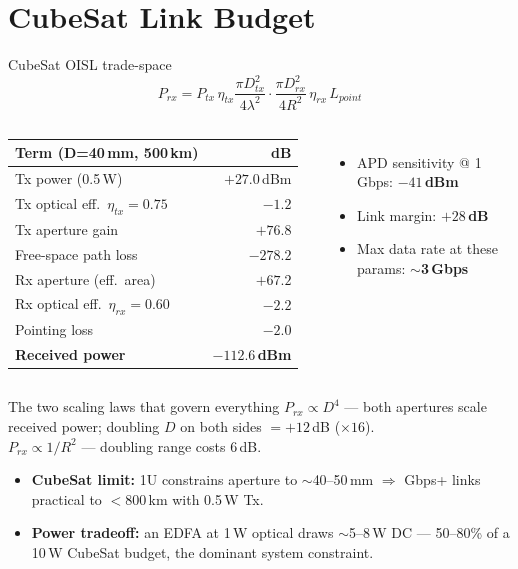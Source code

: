 \documentclass{KAIST-slide}
\newcommand{\ai}{\item[\textcolor{islcteal}{\ding{228}}]}      %
\newcommand{\hi}[1]{\textcolor{islcorange}{\textbf{#1}}}       %
\newcommand{\key}[1]{\textcolor{islcblue}{\textbf{#1}}}        %
\begin{document}
\section{CubeSat Link Budget}

\begin{frame}[allowframebreaks=1.2]{CubeSat OISL trade-space}
    \begin{equation*}
        P_{rx}=P_{tx}\,\eta_{tx}\frac{\pi D_{tx}^{2}}{4\lambda^{2}}\cdot\frac{\pi D_{rx}^{2}}{4R^{2}}\,\eta_{rx}\,L_{point}
    \end{equation*}
    \begin{columns}[T]
    \scriptsize
    \begin{tabular}{l r}
        \hline
        \textbf{Term (D=40\,mm, 500\,km)} & \textbf{dB}\\
        \hline
        Tx power (0.5\,W)        & $+27.0$\,dBm\\
        Tx optical eff.\ $\eta_{tx}=0.75$ & $-1.2$\\
        Tx aperture gain         & $+76.8$\\
        Free-space path loss     & $-278.2$\\
        Rx aperture (eff.\ area)  & $+67.2$\\
        Rx optical eff.\ $\eta_{rx}=0.60$ & $-2.2$\\
        Pointing loss            & $-2.0$\\
        \hline
        \textbf{Received power}  & $\mathbf{-112.6}$\,\textbf{dBm}\\
        \hline
    \end{tabular}
        \begin{itemize}\footnotesize
            \ai APD sensitivity @ 1\,Gbps: \hi{$-41$\,dBm}
            \ai Link margin: \hi{$+28$\,dB}
            \ai Max data rate at these params: \hi{$\sim$3\,Gbps}
        \end{itemize}
    \end{columns}
    \framebreak
    \begin{block}{The two scaling laws that govern everything}
    \footnotesize
    \key{$P_{rx}\propto D^{4}$} --- both apertures scale received power; doubling $D$ on both sides $=+12$\,dB ($\times16$). \\
    \key{$P_{rx}\propto 1/R^{2}$} --- doubling range costs 6\,dB.
    \end{block}
    \begin{itemize}\footnotesize
        \ai \hi{CubeSat limit:} 1U constrains aperture to $\sim$40--50\,mm $\Rightarrow$ Gbps+ links practical to $<$800\,km with 0.5\,W Tx.
        \ai \hi{Power tradeoff:} an EDFA at 1\,W optical draws $\sim$5--8\,W DC --- 50--80\% of a 10\,W CubeSat budget, the dominant system constraint.
    \end{itemize}
\end{frame}
\end{document}
